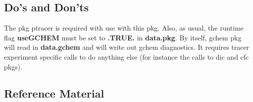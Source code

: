 \subsection{Do's and Don'ts}

The pkg ptracer is required with use with this pkg. Also, as usual, the
runtime flag \textbf{useGCHEM} must be set to \textbf{.TRUE.} in \textbf{data.pkg}.
By itself, gchem pkg will read in \textbf{data.gchem} and will
write out gchem diagnostics. It requires tracer experiment
specific calls to do anything else (for instance the calls
to dic and cfc pkgs).

\subsection{Reference Material}

